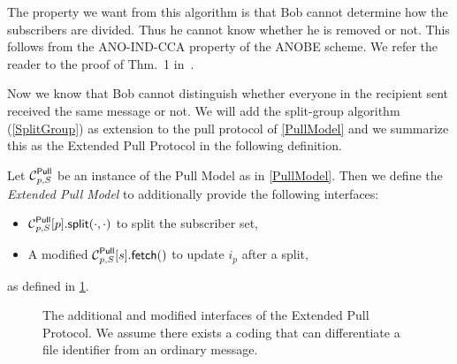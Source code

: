 The property we want from this algorithm is that Bob cannot determine how the 
subscribers are divided.
Thus he cannot know whether he is removed or not.
This follows from the ANO-IND-CCA property of the \ac{ANOBE} scheme.
We refer the reader to the proof of Thm.~1 in~\cite{ANOBE}.

Now we know that Bob cannot distinguish whether everyone in the recipient sent 
received the same message or not.
We will add the split-group algorithm (\cref{SplitGroup}) as extension to the 
pull protocol of \cref{PullModel} and we summarize this as the Extended Pull 
Protocol in the following definition.

\begin{definition}\label{ExtPullModel}
  Let \(\Pull[p, S]\) be an instance of the Pull Model as in \cref{PullModel}.
  Then we define the \emph{Extended Pull Model} to additionally provide the 
  following interfaces:
  \begin{itemize}
    \item \(\psplit[p, S]{p}[\cdot, \cdot]\) to split the subscriber set,
    \item A modified \(\pget[p, S]{s}[]\) to update \(i_p\) after a split,
  \end{itemize}
  as defined in \cref{ExtPullFunctions}.
\end{definition}

\begin{figure}
  \caption{%
    The additional and modified interfaces of the Extended Pull Protocol.
    We assume there exists a coding that can differentiate a file identifier 
    from an ordinary message.
  }\label{ExtPullFunctions}
\end{figure}

